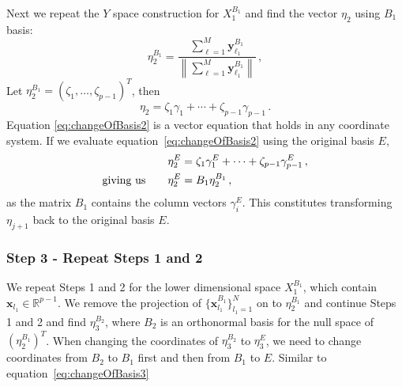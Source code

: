 \documentclass[letter,12pt]{article}
\begin{document}
{Next we repeat the $Y$ space construction for $X_1^{B_1}$ and find the vector $\eta_2$ using $B_1$ basis: %
\begin{equation}\label{eq:secMF11}
	\eta_2^{B_1} = \frac{\sum_{\ell=1}^M \bm{y}_{\ell_1}^{B_1} }{ \left\lVert\sum_{\ell=1}^M \bm{y}_{\ell_1}^{B_1}\right\rVert }\,,
\end{equation}
Let $\eta_2^{B_1} = \left( \zeta_1, \ldots, \zeta_{p-1} \right)^T$, then 
\begin{equation}\label{eq:changeOfBasis2}
    \eta_2 = \zeta_1 \gamma_1 + \cdots + \zeta_{p-1}\gamma_{p-1} \, .
\end{equation}
Equation \eqref{eq:changeOfBasis2} is a vector equation that holds in any coordinate system. If we evaluate  equation~\eqref{eq:changeOfBasis2} using the original basis $E$, %
\begin{align}\label{eq:changeOfBasis3}
    \eta_2^{E} & = \zeta_1 \gamma_1^E + \cdots + \zeta_{p-1}\gamma_{p-1}^E \, , \notag \\
 \text{giving us} \qquad    \eta_2^{E} &=  B_1 \eta_2^{B_1} \, ,
\end{align}
as the matrix $B_1$ contains the column vectors $\gamma_i^E$. This constitutes transforming $\eta_{j+1}$ back to the original basis $E$. 
\subsubsection{Step 3 - Repeat Steps 1 and 2}
We repeat Steps 1 and 2 for the lower dimensional space $X_1^{B_1}$, which contain $\bm{x}_{l_1} \in \mathbb{R}^{p-1}$. We remove the projection of $\{\bm{x}_{l_1}^{B_1}\}_{l_1 = 1}^N$ on to $\eta_2^{B_1}$ and continue Steps 1 and 2 and find $\eta_3^{B_2}$, where $B_2$ is an orthonormal basis for the null space of $\left(\eta_2^{B_1}\right)^T$. When changing the coordinates of $\eta_3^{B_2}$ to $\eta_3^{E}$, we need to change coordinates from $B_2$ to $B_1$ first and then from $B_1$ to $E$. Similar to equation~\eqref{eq:changeOfBasis3}
 
}
\end{document}
